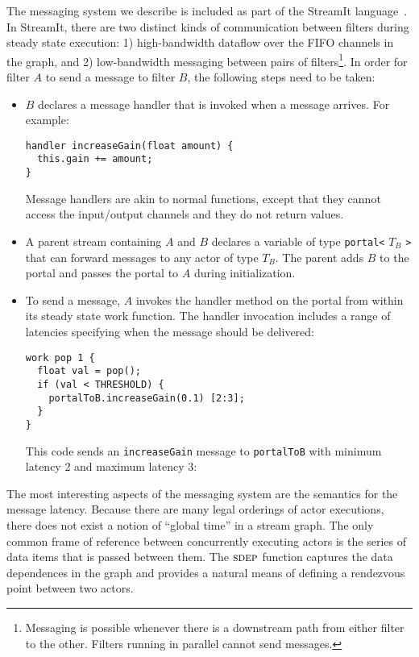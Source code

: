 The messaging system we describe is included as part of the StreamIt
language~\cite{streamitcc}.  In StreamIt, there are two distinct kinds
of communication between filters during steady state execution: 1)
high-bandwidth dataflow over the FIFO channels in the graph, and 2)
low-bandwidth messaging between pairs of filters\footnote{Messaging
is possible whenever there is a downstream path from either filter to
the other.  Filters running in parallel cannot send messages.}.  In
order for filter $A$ to send a message to filter $B$, the following
steps need to be taken:
\begin{itemize}

\item $B$ declares a message handler that is invoked when a
message arrives.  For example:
{\small
\begin{verbatim}
handler increaseGain(float amount) {
  this.gain += amount;
}
\end{verbatim}
}
Message handlers are akin to normal functions, except that they
cannot access the input/output channels and they do not return values.

\item A parent stream containing $A$ and $B$ declares a variable
of type {\tt portal<} $T_B$ {\tt >} that can forward messages to
any actor of type $T_B$.  The parent adds $B$ to the portal and passes
the portal to $A$ during initialization.

\item To send a message, $A$ invokes the handler method on the portal
from within its steady state work function. The handler invocation
includes a range of latencies specifying when the message should be
delivered: {\small
\begin{verbatim}
work pop 1 {
  float val = pop();
  if (val < THRESHOLD) {
    portalToB.increaseGain(0.1) [2:3];
  }
}
\end{verbatim}}
This code sends an {\tt increaseGain} message to {\tt portalToB} with
minimum latency 2 and maximum latency 3:

\end{itemize}
The most interesting aspects of the messaging system are the semantics
for the message latency.  Because there are many legal orderings of actor
executions, there does not exist a notion of ``global time'' in a stream graph.
The only common frame of reference between concurrently executing
actors is the series of data items that is passed between them.  The
$\textsc{sdep}$ function captures the data dependences in the graph and
provides a natural means of defining a rendezvous point between two
actors.

